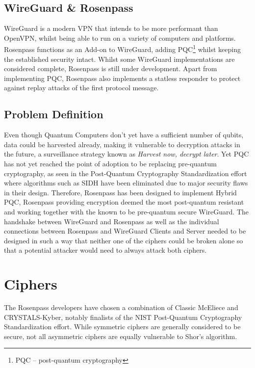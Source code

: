 \documentclass[sigconf]{acmart}
\begin{document}
\subsection{WireGuard \& Rosenpass}
WireGuard is a modern VPN that intends to be more performant than OpenVPN, whilst being able to run on a variety of computers and platforms\cite{WireGuard}. Rosenpass functions as an Add-on to WireGuard, adding PQC\footnote{PQC -- post-quantum cryptography} whilst keeping the established security intact. Whilst some WireGuard implementations are considered complete\cite{wg-repos}, Rosenpass is still under development\cite{rosenpass}. Apart from implementing PQC, Rosenpass also implements a statless responder to protect against replay attacks of the first protocol message.

\subsection{Problem Definition}
Even though Quantum Computers don't yet have a sufficient number of qubits, data could be harvested already, making it vulnerable to decryption attacks in the future, a surveillance strategy known as \textit{Harvest now, decrypt later}. Yet PQC has not yet reached the point of adoption to be replacing pre-quantum cryptography, as seen in the Post-Quantum Cryptography Standardization effort where algorithms such as SIDH have been eliminated due to major security flaws in their design\cite{cryptoeprint:2022/975}. Therefore, Rosenpass has been designed to implement Hybrid PQC\cite{cryptoeprint:2022/1225}, Rosenpass providing encryption deemed the most post-quantum resistant and working together with the known to be pre-quantum secure WireGuard. The handshake between WireGuard and Rosenpass as well as the individual connections between Rosenpass and WireGuard Clients and Server needed to be designed in such a way that neither one of the ciphers could be broken alone so that a potential attacker would need to always attack both ciphers.


\section{Ciphers}
The Rosenpass developers have chosen a combination of Classic McEliece and CRYSTALS-Kyber, notably finalists of the NIST Post-Quantum Cryptography Standardization effort\cite{pqc-standardization}. While symmetric ciphers are generally considered to be secure, not all asymmetric ciphers are equally vulnerable to Shor's algorithm.
\end{document}
